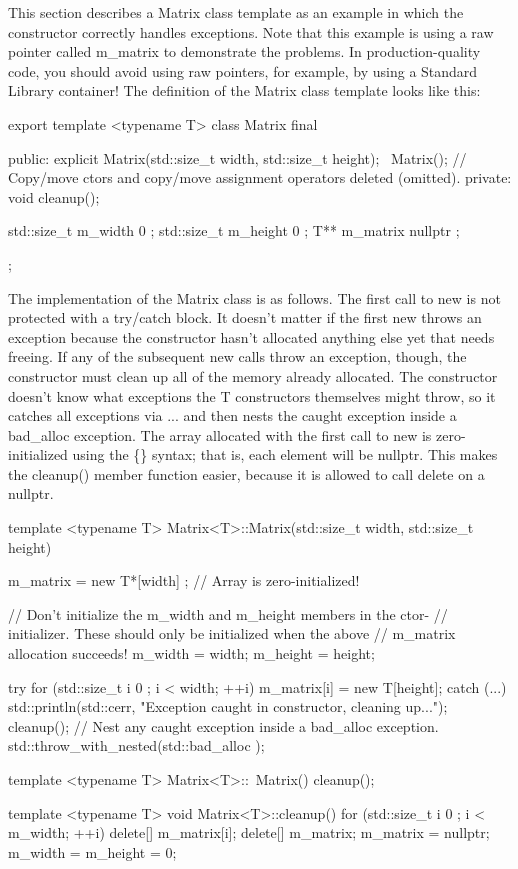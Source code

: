 This section describes a Matrix class template as an example in which the constructor correctly handles exceptions. Note that this example is using a raw pointer called m\_matrix to demonstrate the problems. In production-quality code, you should avoid using raw pointers, for example, by using a Standard Library container! The definition of the Matrix class template looks like this:

\begin{cpp}
export template <typename T>
class Matrix final
{
    public:
        explicit Matrix(std::size_t width, std::size_t height);
        ~Matrix();
        // Copy/move ctors and copy/move assignment operators deleted (omitted).
    private:
        void cleanup();

        std::size_t m_width { 0 };
        std::size_t m_height { 0 };
        T** m_matrix { nullptr };
};
\end{cpp}

The implementation of the Matrix class is as follows. The first call to new is not protected with a try/catch block. It doesn’t matter if the first new throws an exception because the constructor hasn’t allocated anything else yet that needs freeing. If any of the subsequent new calls throw an exception, though, the constructor must clean up all of the memory already allocated. The constructor doesn’t know what exceptions the T constructors themselves might throw, so it catches all exceptions via ... and then nests the caught exception inside a bad\_alloc exception. The array allocated with the first call to new is zero-initialized using the \{\} syntax; that is, each element will be nullptr. This makes the cleanup() member function easier, because it is allowed to call delete on a nullptr.

\begin{cpp}
template <typename T>
Matrix<T>::Matrix(std::size_t width, std::size_t height)
{
    m_matrix = new T*[width] {}; // Array is zero-initialized!

    // Don't initialize the m_width and m_height members in the ctor-
    // initializer. These should only be initialized when the above
    // m_matrix allocation succeeds!
    m_width = width;
    m_height = height;

    try {
        for (std::size_t i { 0 }; i < width; ++i) {
            m_matrix[i] = new T[height];
        }
    } catch (...) {
        std::println(std::cerr, "Exception caught in constructor, cleaning up...");
        cleanup();
        // Nest any caught exception inside a bad_alloc exception.
        std::throw_with_nested(std::bad_alloc {});
    }
}

template <typename T>
Matrix<T>::~Matrix()
{
    cleanup();
}

template <typename T>
void Matrix<T>::cleanup()
{
    for (std::size_t i { 0 }; i < m_width; ++i) {
        delete[] m_matrix[i];
    }
    delete[] m_matrix;
    m_matrix = nullptr;
    m_width = m_height = 0;
}
\end{cpp}

